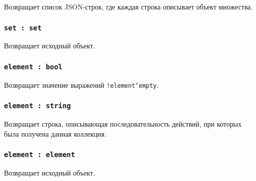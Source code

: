 Возвращает список JSON-строк, где каждая строка описывает объект множества.

\subsubsection{\texttt{set : set}}

Возвращает исходный объект.

\subsubsection{\texttt{element : bool}}

Возвращает значение выражений \texttt{!element'empty}.

\subsubsection{\texttt{element : string}}

Возвращает строка, описывающая последовательность действий, при которых была получена данная коллекция.

\subsubsection{\texttt{element : element}}

Возвращает исходный объект.
